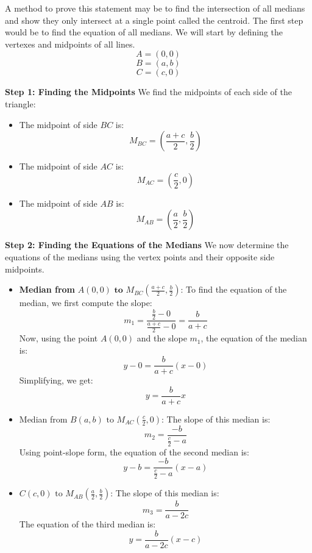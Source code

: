 \documentclass[12pt, a4paper]{article}
\begin{document}
A method to prove this statement may be to find the intersection of all medians and show they only intersect at a single point called the centroid. The first step would be to find the equation of all medians. We will start by defining the vertexes and midpoints of all lines.
\[
A = (0,0)
\]
\[
B = (a,b)
\]
\[
C = (c,0)
\]

\noindent \textbf{Step 1: Finding the Midpoints} \newline
We find the midpoints of each side of the triangle:

\begin{itemize}
    \item The midpoint of side \( BC \) is:
    \[
    M_{BC} = \left( \frac{a + c}{2}, \frac{b}{2} \right)
    \]
    \item The midpoint of side \( AC \) is:
    \[
    M_{AC} = \left( \frac{c}{2}, 0 \right)
    \]
    \item The midpoint of side \( AB \) is:
    \[
    M_{AB} = \left( \frac{a}{2}, \frac{b}{2} \right)
    \]
\end{itemize}

\noindent \textbf{Step 2: Finding the Equations of the Medians} \newline
We now determine the equations of the medians using the vertex points and their opposite side midpoints.

\begin{itemize}
    \item \textbf{Median from} \( A(0,0) \textbf{ to } M_{BC} \left( \frac{a+c}{2}, \frac{b}{2} \right) \): \newline
    To find the equation of the median, we first compute the slope:
    \[
    m_1 = \frac{\frac{b}{2} - 0}{\frac{a+c}{2} - 0} = \frac{b}{a+c}
    \]
    Now, using the point \( A(0,0) \) and the slope \( m_1 \), the equation of the median is:
    \[
    y - 0 = \frac{b}{a+c}(x - 0)
    \]
    Simplifying, we get:
    \[
    y = \frac{b}{a+c}x
    \]
    
    \item Median from \( B(a, b) \text{ to }  M_{AC} \left( \frac{c}{2}, 0 \right) \): \newline
    The slope of this median is:
    \[
    m_2 = \frac{-b}{\frac{c}{2} - a}
    \]
    Using point-slope form, the equation of the second median is:
    \[
    y - b = \frac{-b}{\frac{c}{2} - a}(x - a)
    \]
    
    \item {} \( C(c, 0) \text{ to } M_{AB} \left( \frac{a}{2}, \frac{b}{2} \right) \): \newline
    The slope of this median is:
    \[
    m_3 = \frac{b}{a - 2c}
    \]
    The equation of the third median is:
    \[
    y = \frac{b}{a - 2c}(x - c)
    \]
\end{itemize}
\end{document}
